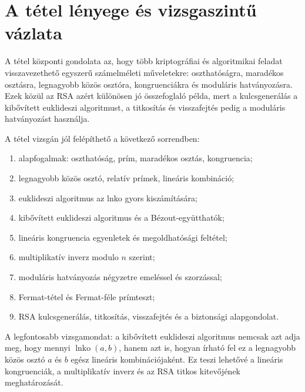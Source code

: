 \section{A tétel lényege és vizsgaszintű vázlata}

\begin{summarybox}
A tétel központi gondolata az, hogy több kriptográfiai és algoritmikai feladat visszavezethető egyszerű számelméleti műveletekre: oszthatóságra, maradékos osztásra, legnagyobb közös osztóra, kongruenciákra és moduláris hatványozásra. Ezek közül az RSA azért különösen jó összefoglaló példa, mert a kulcsgenerálás a kibővített euklideszi algoritmust, a titkosítás és visszafejtés pedig a moduláris hatványozást használja.
\end{summarybox}

A tétel vizsgán jól felépíthető a következő sorrendben:

\begin{enumerate}
  \item alapfogalmak: oszthatóság, prím, maradékos osztás, kongruencia;
  \item legnagyobb közös osztó, relatív prímek, lineáris kombináció;
  \item euklideszi algoritmus az lnko gyors kiszámítására;
  \item kibővített euklideszi algoritmus és a Bézout-együtthatók;
  \item lineáris kongruencia egyenletek és megoldhatósági feltétel;
  \item multiplikatív inverz modulo $n$ szerint;
  \item moduláris hatványozás négyzetre emeléssel és szorzással;
  \item Fermat-tétel és Fermat-féle prímteszt;
  \item RSA kulcsgenerálás, titkosítás, visszafejtés és a biztonsági alapgondolat.
\end{enumerate}

A legfontosabb vizsgamondat: a kibővített euklideszi algoritmus nemcsak azt adja meg, hogy mennyi $\operatorname{lnko}(a,b)$, hanem azt is, hogyan írható fel ez a legnagyobb közös osztó $a$ és $b$ egész lineáris kombinációjaként. Ez teszi lehetővé a lineáris kongruenciák, a multiplikatív inverz és az RSA titkos kitevőjének meghatározását.

\begin{center}

\end{center}

